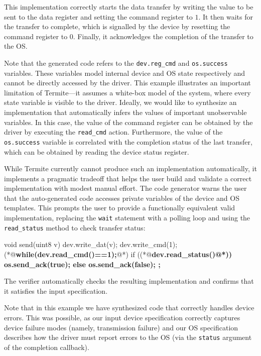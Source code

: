 \documentclass{book}
\newcommand{\termite}{Termite\xspace}
\theoremstyle{definition}
\newcommand{\src}[1]{\texttt{\small #1}}
\begin{document}
This implementation correctly starts the data transfer by writing the value to be sent to the data register and setting the command register to $1$.  It then waits for the transfer to complete, which is signalled by the device by resetting the command register to $0$.  Finally, it acknowledges the completion of the transfer to the OS.

Note that the generated code refers to the \src{dev.reg\_cmd} and \src{os.success} variables.  These variables model internal device and OS state respectively and cannot be directly accessed by the driver.  This example illustrates an important limitation of \termite---it assumes a white-box model of the system, where every state variable is visible to the driver.  Ideally, we would like to synthesize an implementation that automatically infers the values of important unobservable variables.  In this case, the value of the command register can be obtained by the driver by executing the \src{read\_cmd} action.  Furthermore, the value of the \src{os.success} variable is correlated with the completion status of the last transfer, which can be obtained by reading the device status register.

While \termite currently cannot produce such an implementation automatically, it implements a pragmatic tradeoff that helps the user build and validate a correct implementation with modest manual effort.  The code generator warns the user that the auto-generated code accesses  private variables of the device and OS templates.  This prompts the user to provide a functionally equivalent valid implementation, replacing the \src{wait} statement with a polling loop and using the \src{read\_status} method to check transfer status:

\begin{tsllisting}[keywords=, frame=single]
void send(uint8 v){
    dev.write_dat(v);
    dev.write_cmd(1);
    (*@{\bf\ttfamily while(dev.read\_cmd()==1){};}@*)
    if ((*@\bf\ttfamily dev.read\_status()@*)) {
        os.send_ack(true);
    } else {
        os.send_ack(false);
    };}
\end{tsllisting}

The verifier automatically checks the resulting implementation and confirms that it satisfies the input specification.

Note that in this example we have synthesized code that correctly handles device errors.  This was possible, as our input device specification correctly captures device failure modes (namely, transmission failure) and our OS specification describes how the driver must report errors to the OS (via the \src{status} argument of the completion callback).
\end{document}
